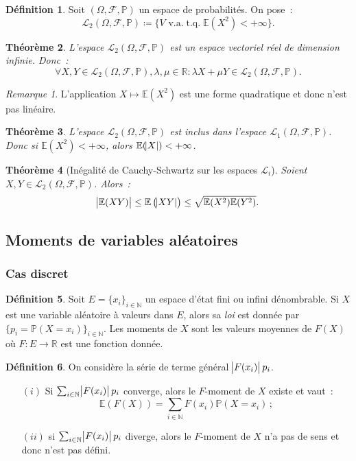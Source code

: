 \documentclass{article}
\newcommand{\E}{\mathbb E}
\newcommand{\N}{\mathbb N}
\renewcommand{\P}{\mathbb P}
\newcommand{\R}{\mathbb R}
\newcommand{\espproba}[3]{\left(#1, #2, #3\right)}  %
\newcommand{\Ofp}{\espproba \Omega{\mathcal F}\P}  %
\newcommand{\Lu}{\mathcal L_1\Ofp}  %
\newcommand{\Ld}{\mathcal L_2\Ofp}  %
\DeclareMathOperator{\tq}{t.q.}
\newtheorem{thm}{Théorème}[section]
\theoremstyle{definition}
\newtheorem{déf}[thm]{Définition}
\theoremstyle{remark}
\newtheorem*{rmq}{Remarque}
\begin{document}
		\begin{déf} Soit $\Ofp$ un espace de probabilités. On pose~:
		\[\Ld \coloneqq \{V \text{ v.a.} \tq \E(X^2) < +\infty\}.\]
		\end{déf}

		\begin{thm} L'espace $\Ld$ est un espace vectoriel réel de dimension infinie. Donc~:
		\[\forall X, Y \in \Ld, \lambda, \mu \in \R : \lambda X + \mu Y \in \Ld.\]
		\end{thm}

		\begin{rmq} L'application $X \mapsto \E(X^2)$ est une forme quadratique et donc n'est pas linéaire. \end{rmq}

		\begin{thm} L'espace $\Ld$ est inclus dans l'espace $\Lu$. Donc si $\E(X^2) < +\infty$, alors $\E(\abs X) < +\infty$. \end{thm}

		\begin{thm}[Inégalité de Cauchy-Schwartz sur les espaces $\mathcal L_i$] Soient $X, Y \in \Ld$. Alors~:
		\begin{equation}\label{eq:C-SL2}
			\abs {\E(XY)} \leq \E\left(\abs {XY}\right) \leq \sqrt{\E(X^2)\E(Y^2)}.
		\end{equation}
		\end{thm}

	\subsection{Moments de variables aléatoires}
		\subsubsection{Cas discret}
		\begin{déf} Soit $E = \{x_i\}_{i \in \N}$ un espace d'état fini ou infini dénombrable. Si $X$ est une variable aléatoire à valeurs dans $E$, alors sa 
		\emph{loi} est donnée par $\{p_i = \P(X = x_i)\}_{i \in \N}$. Les moments de $X$ sont les valeurs moyennes de $F(X)$ où $F : E \to \R$ est une fonction
		donnée. \end{déf}

		\begin{déf} On considère la série de terme général $\abs {F(x_i)}p_i$.

		\begin{itemize}
			\item[$(i)$] Si $\sum_{i \in \N}\abs{F(x_i)}p_i$ converge, alors le $F$-moment de $X$ existe et vaut~:
			             \[\E(F(X)) = \sum_{i \in \N}F(x_i)\P(X=x_i)\,;\]
			\item[$(ii)$] si $\sum_{i \in \N}\abs{F(x_i)}p_i$ diverge, alors le $F$-moment de $X$ n'a pas de sens et donc n'est pas défini.
		\end{itemize}
		\end{déf}
\end{document}
